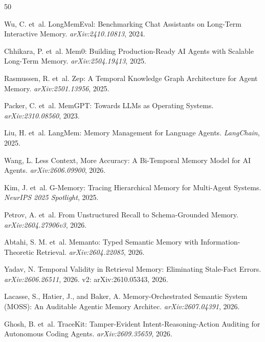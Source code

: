 \documentclass{article}
\begin{document}
\begin{thebibliography}{50}

Wu, C. et~al.
\newblock LongMemEval: Benchmarking Chat Assistants on Long-Term Interactive Memory. \newblock \emph{arXiv:2410.10813}, 2024.

Chhikara, P. et~al.
\newblock Mem0: Building Production-Ready AI Agents with Scalable Long-Term Memory.
\newblock \emph{arXiv:2504.19413}, 2025.

Rasmussen, R. et~al.
\newblock Zep: A Temporal Knowledge Graph Architecture for Agent Memory.
\newblock \emph{arXiv:2501.13956}, 2025.

Packer, C. et~al.
\newblock MemGPT: Towards LLMs as Operating Systems.
\newblock \emph{arXiv:2310.08560}, 2023.

Liu, H. et~al.
\newblock LangMem: Memory Management for Language Agents.
\newblock \emph{LangChain}, 2025.

Wang, L.
\newblock Less Context, More Accuracy: A Bi-Temporal Memory Model for AI Agents.
\newblock \emph{arXiv:2606.09900}, 2026.

Kim, J. et~al.
\newblock G-Memory: Tracing Hierarchical Memory for Multi-Agent Systems.
\newblock \emph{NeurIPS 2025 Spotlight}, 2025.

Petrov, A. et~al.
\newblock From Unstructured Recall to Schema-Grounded Memory.
\newblock \emph{arXiv:2604.27906v3}, 2026.

Abtahi, S. M. et~al.
\newblock Memanto: Typed Semantic Memory with Information-Theoretic Retrieval.
\newblock \emph{arXiv:2604.22085}, 2026.

Yadav, N.
\newblock Temporal Validity in Retrieval Memory: Eliminating Stale-Fact Errors.
\newblock \emph{arXiv:2606.26511}, 2026. v2: arXiv:2610.05343, 2026.

Lacasse, S., Hatier, J., and Baker, A.
\newblock Memory-Orchestrated Semantic System (MOSS): An Auditable Agentic Memory Architec. \newblock \emph{arXiv:2607.04391}, 2026.

Ghosh, B. et~al.
\newblock TraceKit: Tamper-Evident Intent-Reasoning-Action Auditing for Autonomous Coding Agents.
\newblock \emph{arXiv:2609.35659}, 2026.


\end{thebibliography}
\end{document}
